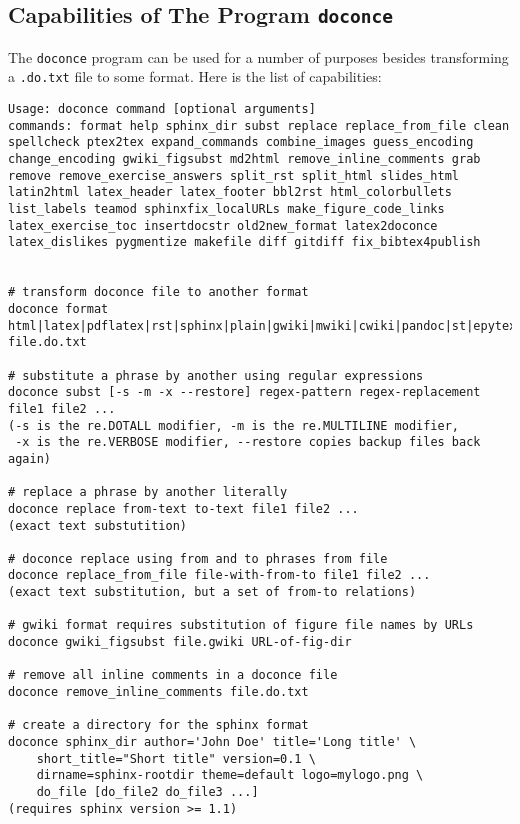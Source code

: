 \documentclass[%
oneside,                 %
final,                   %
10pt]{article}
\begin{document}
\subsection{Capabilities of The Program \protect\Verb!doconce! }

The \Verb!doconce! program can be used for a number of purposes besides
transforming a \Verb!.do.txt! file to some format. Here is the
list of capabilities:

\begin{Verbatim}[numbers=none,fontsize=\fontsize{9pt}{9pt},baselinestretch=0.85,xleftmargin=0mm]
Usage: doconce command [optional arguments]
commands: format help sphinx_dir subst replace replace_from_file clean spellcheck ptex2tex expand_commands combine_images guess_encoding change_encoding gwiki_figsubst md2html remove_inline_comments grab remove remove_exercise_answers split_rst split_html slides_html latin2html latex_header latex_footer bbl2rst html_colorbullets list_labels teamod sphinxfix_localURLs make_figure_code_links latex_exercise_toc insertdocstr old2new_format latex2doconce latex_dislikes pygmentize makefile diff gitdiff fix_bibtex4publish


# transform doconce file to another format
doconce format html|latex|pdflatex|rst|sphinx|plain|gwiki|mwiki|cwiki|pandoc|st|epytext file.do.txt

# substitute a phrase by another using regular expressions
doconce subst [-s -m -x --restore] regex-pattern regex-replacement file1 file2 ...
(-s is the re.DOTALL modifier, -m is the re.MULTILINE modifier,
 -x is the re.VERBOSE modifier, --restore copies backup files back again)

# replace a phrase by another literally
doconce replace from-text to-text file1 file2 ...
(exact text substutition)

# doconce replace using from and to phrases from file
doconce replace_from_file file-with-from-to file1 file2 ...
(exact text substitution, but a set of from-to relations)

# gwiki format requires substitution of figure file names by URLs
doconce gwiki_figsubst file.gwiki URL-of-fig-dir

# remove all inline comments in a doconce file
doconce remove_inline_comments file.do.txt

# create a directory for the sphinx format
doconce sphinx_dir author='John Doe' title='Long title' \
    short_title="Short title" version=0.1 \
    dirname=sphinx-rootdir theme=default logo=mylogo.png \
    do_file [do_file2 do_file3 ...]
(requires sphinx version >= 1.1)


\end{Verbatim}
\end{document}
